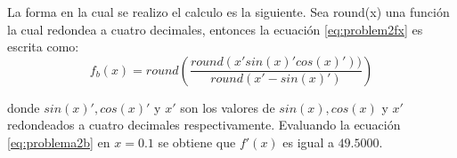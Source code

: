 La forma en la cual se realizo el calculo es la siguiente. Sea round(x) una función la cual redondea a cuatro decimales, entonces la ecuación \ref{eq:problem2fx} es escrita como:
\begin{equation}
    f_b(x) = round\left(\frac{round(x'sin(x)'cos(x)'))}{round(x'-sin(x)')}\right)
    \label{eq:problema2b}
\end{equation}

donde $sin(x)', cos(x)'$ y $x'$ son los valores de $sin(x),cos(x)$ y $x'$ redondeados a cuatro decimales respectivamente. Evaluando la ecuación \ref{eq:problema2b} en $x=0.1$ se obtiene que $f'(x)$ es igual a $49.5000$.

